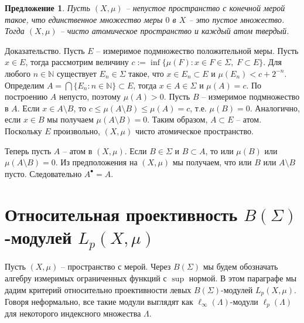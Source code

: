 \documentclass[12pt]{article}
\numberwithin{equation}{subsection}
\theoremstyle{plain}
\newtheorem{proposition}{Предложение}
\newenvironment{proof}{Доказательство.}{}
\begin{document}
\begin{fulltext}
    \begin{proposition}\label{GenniunelyAtomicMeasCharac} Пусть $(X,\mu)$ -- непустое пространство с конечной мерой такое, что единственное множество меры $0$ в $X$ -- это пустое множество. Тогда $(X,\mu)$ -- чисто атомическое пространство и каждый атом твердый.
    \end{proposition}
    \begin{proof} Пусть $E$ -- измеримое подмножество положительной меры. Пусть $x\in E$, тогда рассмотрим величину $c:=\inf\{\mu(F):x\in F\in \Sigma,\; F\subset E\}$. Для любого $n\in\mathbb{N}$ существует $E_n\in\Sigma$ такое, что $x\in E_n\subset E$ и $\mu(E_n)<c+2^{-n}$. Определим $A=\bigcap\{E_n:n\in\mathbb{N}\}\subset E$, тогда $x\in A\in\Sigma$ и $\mu(A)=c$. По построению $A$ непусто, поэтому $\mu(A)>0$. Пусть $B$ -- измеримое подмножество в $A$. Если $x\in A\setminus B$, то $c\leq\mu(A\setminus B)\leq\mu(A)=c$, т.е. $\mu(B)=0$. Аналогично, если $x\in B$ мы получаем $\mu(A\setminus B)=0$. Таким образом, $A\subset E$ -- атом. Поскольку $E$ произвольно, $(X,\mu)$ чисто атомическое пространство.

        Теперь пусть $A$ -- атом в $(X,\mu)$. Если $B\in\Sigma$ и $B\subset A$, то или $\mu(B)$ или $\mu(A\setminus B)=0$. Из предположения на $(X,\mu)$ мы получаем, что или $B$ или $A\setminus B$ пусто. Следовательно $A^\bullet=A$.
    \end{proof}


    \section{Относительная проективность $B(\Sigma)$-модулей $L_p(X,\mu)$}
    \label{SectionRelativeProjectivityOfBSigmaModulesLpXmu}

    Пусть $(X,\mu)$ -- пространство с мерой. Через $B(\Sigma)$ мы будем обозначать алгебру измеримых ограниченных функций с $\sup$ нормой. В этом параграфе мы дадим критерий относительно проективности левых $B(\Sigma)$-модулей $L_p(X,\mu)$. Говоря неформально, все такие модули выглядят как $\ell_\infty(\Lambda)$-модули $\ell_p(\Lambda)$ для некоторого индексного множества $\Lambda$.


\end{fulltext}
\end{document}
